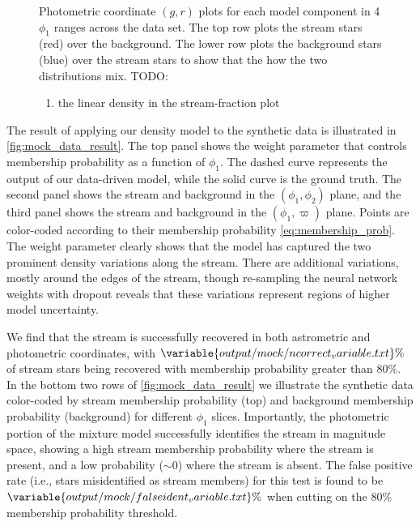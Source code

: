 \documentclass[twocolumn]{aastex631}
\newcommand{\parallax}{\varpi}
\begin{document}
\begin{figure}
{                    Photometric coordinate $(g, r)$ plots for each model component
                    in 4 $\phi_1$ ranges across the data set. The top row plots the
                    stream stars (red) over the background. The lower row plots the
                    background stars (blue) over the stream stars to show that the
                    how the two distributions mix.
            }
            \label{fig:mock_data_result}
            TODO:
            \begin{enumerate}
                \item the linear density in the stream-fraction plot
            \end{enumerate}
        \end{figure}
    
        The result of applying our density model to the synthetic data is
        illustrated in \autoref{fig:mock_data_result}. The top panel shows the
        weight parameter that controls membership probability as a function of
        $\phi_1$. The dashed curve represents the output of our data-driven model,
        while the solid curve is the ground truth. The second panel shows the stream
        and background in the $(\phi_1,\phi_2)$ plane, and the third panel shows the
        stream and background in the $(\phi_1,\parallax)$ plane. Points are
        color-coded according to their membership probability
        \autoref{eq:membership_prob}. The weight parameter clearly shows that the
        model has captured the two prominent density variations along the stream.
        There are additional variations, mostly around the edges of the stream, though
        re-sampling the neural network weights with dropout reveals that these
        variations represent regions of higher model uncertainty. 
    
        We find that the stream is successfully recovered in both astrometric and
        photometric coordinates, with $\variable{output/mock/ncorrect_variable.txt}\%$ of stream
        stars being recovered with membership probability greater than $80\%$.
        In the bottom two rows of \autoref{fig:mock_data_result} we illustrate the
        synthetic data color-coded by stream membership probability (top) and
        background membership probability (background) for different $\phi_1$
        slices. Importantly, the photometric portion of the mixture model
        successfully identifies the stream in magnitude space, showing a high stream
        membership probability where the stream is present, and a low probability
        ($\sim 0$) where the stream is absent.
        The false positive rate (i.e., stars misidentified as stream members) for this test
        is found to be $\variable{output/mock/falseident_variable.txt}\%$ when cutting on
        the 80\% membership probability threshold.
    
\end{document}
